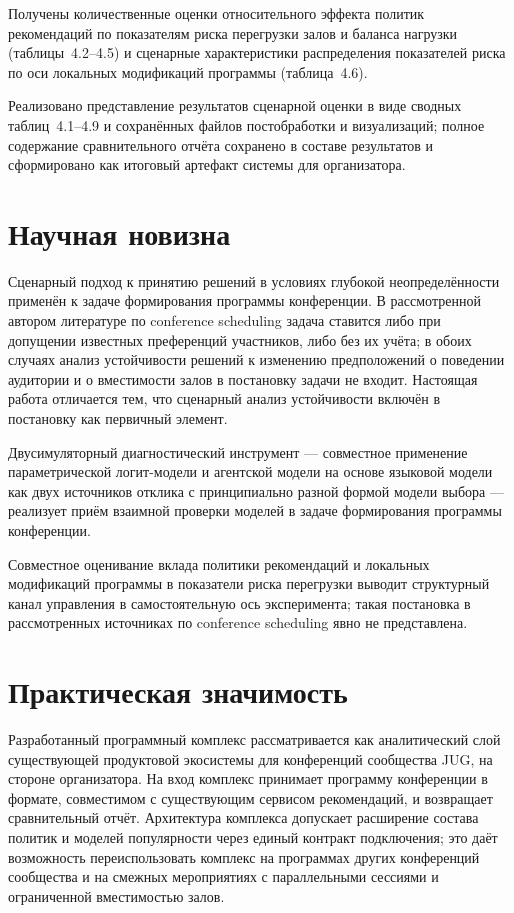 Получены количественные оценки относительного эффекта политик рекомендаций по показателям риска перегрузки залов и баланса нагрузки (таблицы~4.2--4.5) и сценарные характеристики распределения показателей риска по оси локальных модификаций программы (таблица~4.6).

Реализовано представление результатов сценарной оценки в виде сводных таблиц~4.1--4.9 и сохранённых файлов постобработки и визуализаций; полное содержание сравнительного отчёта сохранено в составе результатов и сформировано как итоговый артефакт системы для организатора.


\section*{Научная новизна}

Сценарный подход к принятию решений в условиях глубокой неопределённости применён к задаче формирования программы конференции. В рассмотренной автором литературе по conference scheduling задача ставится либо при допущении известных преференций участников, либо без их учёта; в обоих случаях анализ устойчивости решений к изменению предположений о поведении аудитории и о вместимости залов в постановку задачи не входит. Настоящая работа отличается тем, что сценарный анализ устойчивости включён в постановку как первичный элемент.

Двусимуляторный диагностический инструмент --- совместное применение параметрической логит-модели и агентской модели на основе языковой модели как двух источников отклика с принципиально разной формой модели выбора --- реализует приём взаимной проверки моделей в задаче формирования программы конференции.

Совместное оценивание вклада политики рекомендаций и локальных модификаций программы в показатели риска перегрузки выводит структурный канал управления в самостоятельную ось эксперимента; такая постановка в рассмотренных источниках по conference scheduling явно не представлена.


\section*{Практическая значимость}

Разработанный программный комплекс рассматривается как аналитический слой существующей продуктовой экосистемы для конференций сообщества JUG, на стороне организатора. На вход комплекс принимает программу конференции в формате, совместимом с существующим сервисом рекомендаций, и возвращает сравнительный отчёт. Архитектура комплекса допускает расширение состава политик и моделей популярности через единый контракт подключения; это даёт возможность переиспользовать комплекс на программах других конференций сообщества и на смежных мероприятиях с параллельными сессиями и ограниченной вместимостью залов.

